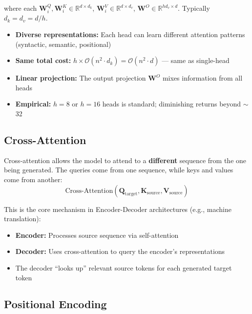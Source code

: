 where each $\mathbf{W}_i^Q, \mathbf{W}_i^K \in \mathbb{R}^{d \times d_k}$, $\mathbf{W}_i^V \in \mathbb{R}^{d \times d_v}$, $\mathbf{W}^O \in \mathbb{R}^{hd_v \times d}$. Typically $d_k = d_v = d/h$.

\begin{properties}
\begin{itemize}
    \item \textbf{Diverse representations:} Each head can learn different attention patterns (syntactic, semantic, positional)
    \item \textbf{Same total cost:} $h \times \mathcal{O}(n^2 \cdot d_k) = \mathcal{O}(n^2 \cdot d)$ --- same as single-head
    \item \textbf{Linear projection:} The output projection $\mathbf{W}^O$ mixes information from all heads
    \item \textbf{Empirical:} $h = 8$ or $h = 16$ heads is standard; diminishing returns beyond $\sim$32
\end{itemize}
\end{properties}

\subsection{Cross-Attention}

Cross-attention allows the model to attend to a \textbf{different} sequence from the one being generated. The queries come from one sequence, while keys and values come from another:
\begin{equation}
\text{Cross-Attention}(\mathbf{Q}_{\text{target}}, \mathbf{K}_{\text{source}}, \mathbf{V}_{\text{source}})
\end{equation}

This is the core mechanism in Encoder-Decoder architectures (e.g., machine translation):
\begin{itemize}
    \item \textbf{Encoder:} Processes source sequence via self-attention
    \item \textbf{Decoder:} Uses cross-attention to query the encoder's representations
    \item The decoder ``looks up'' relevant source tokens for each generated target token
\end{itemize}

\subsection{Positional Encoding}

